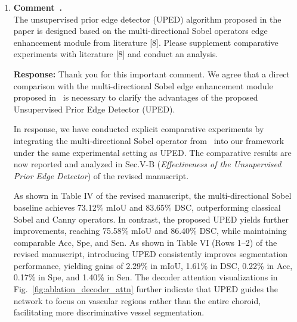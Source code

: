 \documentclass[11pt]{article}
\newcommand{\commentresponse}[2]{{\color{blue}\textbf{Response:} #2}}
\newcommand{\commentitem}{\item \textbf{Comment~\arabic{enumi}.}\\\ignorespaces}
\begin{document}
\begin{enumerate}
    \commentitem The unsupervised prior edge detector (UPED) algorithm proposed in the paper is designed based on the multi-directional Sobel operators edge enhancement module from literature [8]. Please supplement comparative experiments with literature [8] and conduct an analysis.
    
    \commentresponse{2}{
    Thank you for this important comment.
    We agree that a direct comparison with the multi-directional Sobel edge enhancement module proposed in~\cite{dual_encoder_edge} is necessary to clarify the advantages of the proposed Unsupervised Prior Edge Detector (UPED).

    In response, we have conducted explicit comparative experiments by integrating the multi-directional Sobel operator from~\cite{dual_encoder_edge} into our framework under the same experimental setting as UPED.
    The comparative results are now reported and analyzed in Sec.V-B (\emph{Effectiveness of the Unsupervised Prior Edge Detector}) of the revised manuscript.

    As shown in Table IV of the revised manuscript, the multi-directional Sobel baseline achieves 73.12\% mIoU and 83.65\% DSC, outperforming classical Sobel and Canny operators.
    In contrast, the proposed UPED yields further improvements, reaching 75.58\% mIoU and 86.40\% DSC, while maintaining comparable Acc, Spe, and Sen. As shown in Table VI (Rows 1--2) of the revised manuscript, introducing UPED consistently improves segmentation performance, yielding gains of 2.29\% in mIoU, 1.61\% in DSC, 0.22\% in Acc, 0.17\% in Spe, and 1.40\% in Sen. The decoder attention visualizations in Fig.~\ref{fig:ablation_decoder_attn} further indicate that UPED guides the network to focus on vascular regions rather than the entire choroid, facilitating more discriminative vessel segmentation.

}
\end{enumerate}
\end{document}
